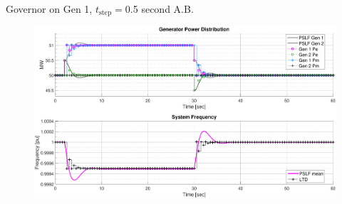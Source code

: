 \documentclass[14pt, unknownkeysallowed]{beamer}
\begin{document}
\begin{frame}
Governor on Gen 1, $t_\text{step}=$0.5 second A.B.
\begin{figure}
	\includegraphics[width=\linewidth]{pgov1TestCab}
\end{figure}
\end{frame}
\end{document}
